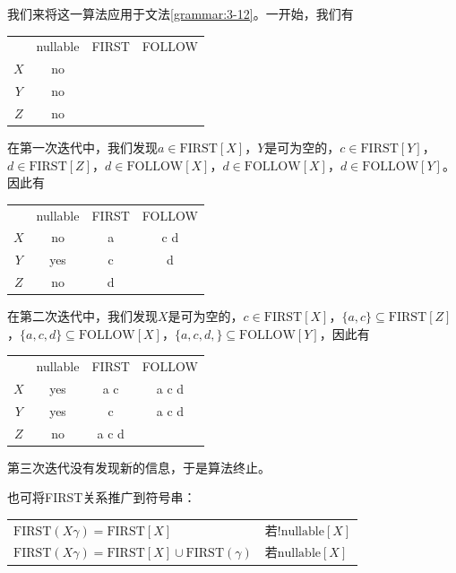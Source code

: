 \documentclass[cn,11pt,chinese]{elegantbook}
\begin{document}
我们来将这一算法应用于文法\ref{grammar:3-12}。一开始，我们有

\begin{center}
  \begin{tabular}{c|ccc}
    \multicolumn{1}{c}{} & nullable & FIRST & FOLLOW \\
    \cline{2-4}
    $X$ & no & & \\
    $Y$ & no & & \\
    $Z$ & no & & \\
  \end{tabular}
\end{center}

在第一次迭代中，我们发现$a\in\text{FIRST}[X]$，$Y$是可为空的，$c\in\text{FIRST}[Y]$，$d\in\text{FIRST}[Z]$，$d\in\text{FOLLOW}[X]$，$d\in\text{FOLLOW}[X]$，$d\in\text{FOLLOW}[Y]$。因此有

\begin{center}
  \begin{tabular}{c|ccc}
    \multicolumn{1}{c}{} & nullable & FIRST & FOLLOW \\
    \cline{2-4}
    $X$ & no & a & c \; d \\
    $Y$ & yes & c & d \\
    $Z$ & no & d & \\
  \end{tabular}
\end{center}

在第二次迭代中，我们发现$X$是可为空的，$c\in\text{FIRST}[X]$，$\{a,c\}\subseteq\text{FIRST}[Z]$，$\{a,c,d\}\subseteq\text{FOLLOW}[X]$，$\{a,c,d,\}\subseteq\text{FOLLOW}[Y]$，因此有

\begin{center}
  \begin{tabular}{c|ccc}
    \multicolumn{1}{c}{} & nullable & FIRST & FOLLOW \\
    \cline{2-4}
    $X$ & yes & a \; c& a \; c \; d \\
    $Y$ & yes & c & a \; c \; d \\
    $Z$ & no & a \; c \; d & \\
  \end{tabular}
\end{center}

第三次迭代没有发现新的信息，于是算法终止。

也可将FIRST关系推广到符号串：

\begin{center}
  \begin{tabular}{ll}
    $\text{FIRST}(X\gamma)=\text{FIRST}[X]$ & 若$!\text{nullable}[X]$ \\
    $\text{FIRST}(X\gamma)=\text{FIRST}[X]\cup\text{FIRST}(\gamma)$ & 若$\text{nullable}[X]$ \\
  \end{tabular}
\end{center}
\end{document}
